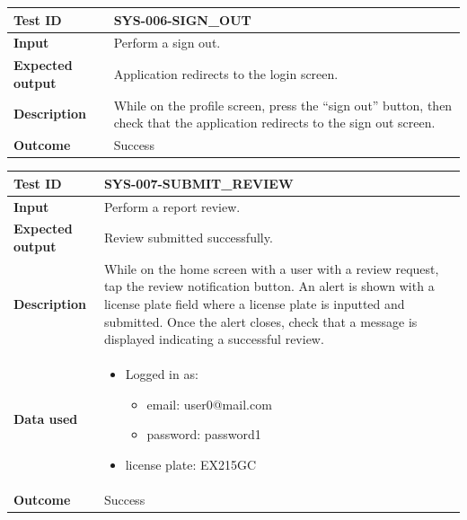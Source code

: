\begin{table}[H]
    \centering
    \begin{tabular}{p{3cm}p{10cm}}
    \textbf{Test ID} & SYS-006-SIGN\_OUT \\ \hline
    \textbf{Input} & Perform a sign out. \\ \hline
    \textbf{Expected output} & Application redirects to the login screen. \\ \hline
    \textbf{Description} & While on the profile screen, press the “sign out” button, then check that the application redirects to the sign out screen. \\ \hline
    \textbf{Outcome} & Success \\ \hline
    \end{tabular}
\end{table}

\begin{table}[H]
    \centering
    \begin{tabular}{p{3cm}p{10cm}}
    \textbf{Test ID} & SYS-007-SUBMIT\_REVIEW \\ \hline
    \textbf{Input} & Perform a report review. \\ \hline
    \textbf{Expected output} & Review submitted successfully. \\ \hline
    \textbf{Description} & While on the home screen with a user with a review request, tap the review notification button. An alert is shown with a license plate field where a license plate is inputted and submitted. Once the alert closes, check that a message is displayed indicating a successful review. \\ \hline
    \textbf{Data used} & 
        \begin{itemize}[label={}] \itemsep0em
            \item Logged in as:
            \begin{itemize}[label={}] \itemsep0em
                \item email: user0@mail.com
                \item password: password1
            \end{itemize}
            \item license plate: EX215GC
        \end{itemize} \\ \hline
    \textbf{Outcome} & Success \\ \hline
    \end{tabular}
\end{table}

